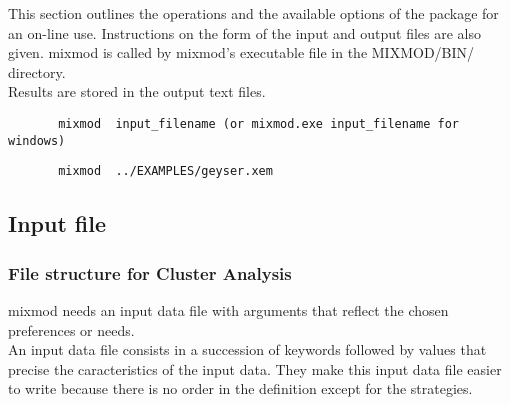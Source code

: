 This section outlines the operations and the available options of the
package for an on-line use. Instructions on the form of the input
and output files are also given. {\sc mixmod} is called by {\sc mixmod}'s executable file in the MIXMOD/BIN/ directory.\\
Results are stored in the output text files.\\

{\scriptsize
\begin{verbatim}
       mixmod  input_filename (or mixmod.exe input_filename for windows)
\end{verbatim}}

{\scriptsize
\begin{verbatim}
       mixmod  ../EXAMPLES/geyser.xem
\end{verbatim}}

\subsection{Input file}

\subsubsection{File structure for Cluster Analysis}

{\sc mixmod} needs an input data file with arguments that reflect the chosen preferences or needs.\\
An input data file consists in a succession of keywords followed by values
that precise the caracteristics of the input data. They
make this input data file easier to write because there is no order in the definition except for
the strategies.

